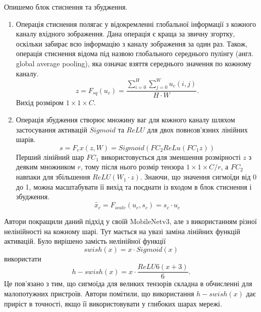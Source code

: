 Опишемо блок стиснення та збудження.
\begin{enumerate}
    \item Операція стиснення полягає у відокремленні глобальної інформації з кожного каналу
          вхідного зображення. Дана операція є краща за звичну згортку, оскільки забирає всю інформацію
          з каналу зображення за один раз. Також, операція стиснення відома під назвою глобального
          середнього пулінгу  (англ. global average pooling), яка означає взяття середнього значення
          по кожному каналу.
          \begin{equation*}
              z = F_{sq}(u_c) = \frac{\sum_{i=0}^{H} \sum_{j=0}^{W} u_c(i,j)}{H\cdot W}.
          \end{equation*}
          Вихід розміром $1 \times 1 \times C$.
    \item Операція збудження створює множину ваг для кожного каналу шляхом застосування
          активацій $Sigmoid$ та $ReLU$ для двох повнозв'язних лінійних шарів.
          \begin{equation*}
              s = F_ex(z,W) = Sigmoid(FC_2ReLu(FC_1z))
          \end{equation*}
          Перший лінійний шар $FC_1$ використовується для зменшення розмірності $z$ з деяким
          множником $r$, тому після нього розмір тензора $1 \times 1 \times C/r$, а $FC_2$ навпаки
          для збільшення $ReLU(W_1 \cdot  z)$. Знаючи, що значення сигмоїди від 0 до 1, можна
          масштабувати її вихід та поєднати із входом в блок стиснення і збудження.
          \begin{equation*}
              \widetilde{x_c} = F_{scale}(u_c,s_c) = s_c\cdot u_c
          \end{equation*}
\end{enumerate}

Автори покращили даний підхід у своїй MobileNetv3, але з використанням
різної нелінійності на кожному шарі. Тут мається на увазі заміна лінійних функцій активацій.
Було вирішено замість нелінійної функції
\begin{equation*}
    swish(x) = x\cdot Sigmoid(x)
\end{equation*}
використати
\begin{equation*}
    h-swish(x) = x\cdot \frac{ReLU6(x + 3)}{6}.
\end{equation*}
Це пов'язано з тим, що сигмоїда для великих тензорів складна в обчисленні
для малопотужних пристроїв. Автори помітили,
що використання $h-swish(x)$ дає приріст в точності, якщо її
використовувати у глибоких шарах мережі.

